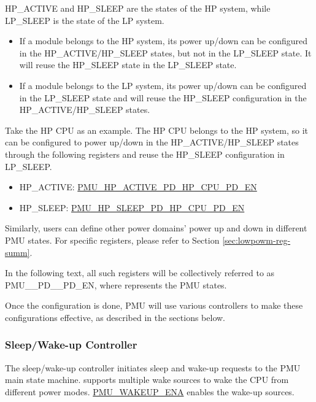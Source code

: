 \documentclass[main\_\_EN.tex]{subfiles}
\begin{document}
HP\_ACTIVE and HP\_SLEEP are the states of the HP system, while LP\_SLEEP is the state of the LP system.

\begin{itemize}
    \item If a module belongs to the HP system, its power up/down can be configured in the HP\_ACTIVE/HP\_SLEEP states, but not in the LP\_SLEEP state. It will reuse the HP\_SLEEP state in the LP\_SLEEP state.
    \item If a module belongs to the LP system, its power up/down can be configured in the LP\_SLEEP state and will reuse the HP\_SLEEP configuration in the HP\_ACTIVE/HP\_SLEEP states.
\end{itemize}

Take the HP CPU as an example. The HP CPU belongs to the HP system, so it can be configured to power up/down in the HP\_ACTIVE/HP\_SLEEP states through the following registers and reuse the HP\_SLEEP configuration in LP\_SLEEP.

\begin{itemize}
    \item HP\_ACTIVE: \hyperref[fielddesc:PMUHPACTIVEPDHPCPUPDEN]{PMU\_HP\_ACTIVE\_PD\_HP\_CPU\_PD\_EN}
    \item HP\_SLEEP: \hyperref[fielddesc:PMUHPSLEEPPDHPCPUPDEN]{PMU\_HP\_SLEEP\_PD\_HP\_CPU\_PD\_EN}
\end{itemize}

Similarly, users can define other power domains' power up and down in different PMU states. For specific registers, please refer to Section \ref{sec:lowpowm-reg-summ}.

\begin{tiplisting}
In the following text, all such registers will be collectively referred to as PMU\_\_PD\_\_PD\_EN, where  represents the PMU states.
\end{tiplisting}

Once the configuration is done, PMU will use various controllers to make these configurations effective, as described in the sections below.

\subsubsection{Sleep/Wake-up Controller}

The sleep/wake-up controller initiates sleep and wake-up requests to the PMU main state machine. \chipname{} supports multiple wake sources to wake the CPU from different power modes. \hyperref[fielddesc:PMUWAKEUPENA]{PMU\_WAKEUP\_ENA} enables the wake-up sources.
\end{document}
